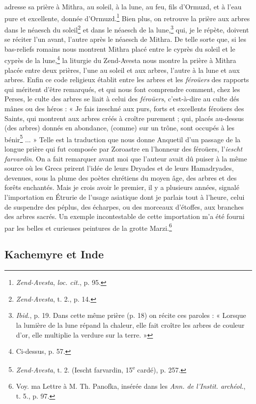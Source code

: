 \documentclass[a4paper, 11pt, oneside, polutonikogreek, french]{article}
\begin{document}
adresse sa prière à Mithra, au soleil, à la lune, au feu, fils d'Ormuzd, et à l'eau pure et excellente, donnée d'Ormuzd.\footnote{\emph{Zend-Avesta}, \emph{loc. cit.}, p. 95.} Bien plus, on retrouve la prière aux arbres dans le néaesch du soleil\footnote{\emph{Zend-Avesta}, t. 2., p. 14.} et dans le néaesch de la lune,\footnote{\emph{Ibid.}, p. 19. Dans cette même prière (p. 18) on récite ces paroles : « Lorsque la lumière de la lune répand la chaleur, elle fait croître les arbres de couleur d'or, elle multiplie la verdure sur la terre. »} qui, je le répète, doivent se réciter l'un avant, l'autre après le néaesch de Mithra. De telle sorte que, si les bas-reliefs romains nous montrent Mithra placé entre le cyprès du soleil et le cyprès de la lune,\footnote{Ci-dessus, p. 57.} la liturgie du Zend-Avesta nous montre la prière à Mithra placée entre deux prières, l'une au soleil et aux arbres, l'autre à la lune et aux arbres. Enfin ce code religieux établit entre les arbres et les \emph{féroüers} des rapports qui méritent d'être remarqués, et qui nous font comprendre comment, chez les Perses, le culte des arbres se liait à celui des \emph{féroüers}, c'est-à-dire au culte dés mânes ou des héros : « Je fais izeschné aux purs, forts et excellents féroüers des Saints, qui montrent aux arbres créés à croître purement ; qui, placés au-dessus (des arbres) donnés en abondance, (comme) sur un trône, sont occupés à les bénir\footnote{\emph{Zend-Avesta}, t. 2. (Iescht farvardin, 15\textsuperscript{e} cardé), p. 257.} ... » Telle est la traduction que nous donne Anquetil d'un passage de la longue prière qui fut composée par Zoroastre en l'honneur des féroüers, l'\emph{iescht farvardin}. On a fait remarquer avant moi que l'auteur avait dû puiser à la même source où les Grecs prirent l'idée de leurs Dryades et de leurs Hamadryades, devenues, sous la plume des poètes chrétiens du moyen âge, des arbres et des forêts enchantés. Mais je crois avoir le premier, il y a plusieurs années, signalé l'importation en Étrurie de l'usage asiatique dont je parlais tout à l'heure, celui de suspendre des péplus, des écharpes, ou des morceaux d'étoffes, aux branches des arbres sacrés. Un exemple incontestable de cette importation m'a été fourni par les belles et curieuses peintures de la grotte Marzi.\footnote{Voy. ma Lettre à M. Th. Panofka, insérée dans les \emph{Ann. de l'Instit. archéol.}, t. 5., p. 97.}
\clearpage
\subsection{Kachemyre et Inde}
\end{document}
